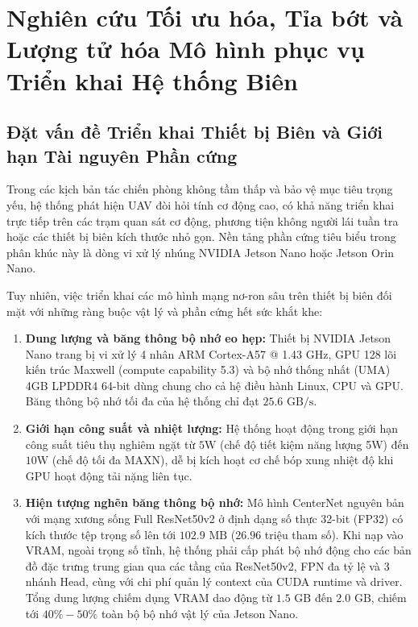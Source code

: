 \documentclass[11pt,a4paper]{article}
\begin{document}
\section{Nghiên cứu Tối ưu hóa, Tỉa bớt và Lượng tử hóa Mô hình phục vụ Triển khai Hệ thống Biên}
\label{sec:optimization_quantization}

\subsection{Đặt vấn đề Triển khai Thiết bị Biên và Giới hạn Tài nguyên Phần cứng}
\label{subsec:edge_deployment_problem}

Trong các kịch bản tác chiến phòng không tầm thấp và bảo vệ mục tiêu trọng yếu, hệ thống phát hiện UAV đòi hỏi tính cơ động cao, có khả năng triển khai trực tiếp trên các trạm quan sát cơ động, phương tiện không người lái tuần tra hoặc các thiết bị biên kích thước nhỏ gọn. Nền tảng phần cứng tiêu biểu trong phân khúc này là dòng vi xử lý nhúng NVIDIA Jetson Nano hoặc Jetson Orin Nano. 

Tuy nhiên, việc triển khai các mô hình mạng nơ-ron sâu trên thiết bị biên đối mặt với những ràng buộc vật lý và phần cứng hết sức khắt khe:
\begin{enumerate}
    \item \textbf{Dung lượng và băng thông bộ nhớ eo hẹp:} Thiết bị NVIDIA Jetson Nano trang bị vi xử lý 4 nhân ARM Cortex-A57 @ 1.43 GHz, GPU 128 lõi kiến trúc Maxwell (compute capability 5.3) và bộ nhớ thống nhất (UMA) 4GB LPDDR4 64-bit dùng chung cho cả hệ điều hành Linux, CPU và GPU. Băng thông bộ nhớ tối đa của hệ thống chỉ đạt $25.6\text{ GB/s}$.
    \item \textbf{Giới hạn công suất và nhiệt lượng:} Hệ thống hoạt động trong giới hạn công suất tiêu thụ nghiêm ngặt từ $5\text{W}$ (chế độ tiết kiệm năng lượng 5W) đến $10\text{W}$ (chế độ tối đa MAXN), dễ bị kích hoạt cơ chế bóp xung nhiệt độ khi GPU hoạt động tải nặng liên tục.
    \item \textbf{Hiện tượng nghẽn băng thông bộ nhớ:} Mô hình CenterNet nguyên bản với mạng xương sống Full ResNet50v2 ở định dạng số thực 32-bit (FP32) có kích thước tệp trọng số lên tới $102.9\text{ MB}$ ($26.96$ triệu tham số). Khi nạp vào VRAM, ngoài trọng số tĩnh, hệ thống phải cấp phát bộ nhớ động cho các bản đồ đặc trưng trung gian qua các tầng của ResNet50v2, FPN đa tỷ lệ và 3 nhánh Head, cùng với chi phí quản lý context của CUDA runtime và driver. Tổng dung lượng chiếm dụng VRAM dao động từ $1.5\text{ GB}$ đến $2.0\text{ GB}$, chiếm tới $40\% - 50\%$ toàn bộ bộ nhớ vật lý của Jetson Nano.
\end{enumerate}
\end{document}
